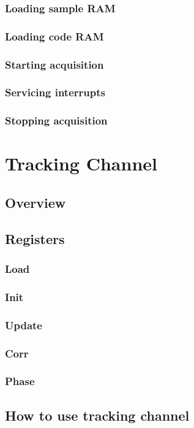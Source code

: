 \documentclass{article}
\begin{document}
\begin{multicols}{2}
\subsubsection{Loading sample RAM}
\subsubsection{Loading code RAM}
\subsubsection{Starting acquisition}
\subsubsection{Servicing interrupts}
\subsubsection{Stopping acquisition}

\section{Tracking Channel}
\subsection{Overview}
\subsection{Registers}
\subsubsection{Load}
\subsubsection{Init}
\subsubsection{Update}
\subsubsection{Corr}
\subsubsection{Phase}
\subsection{How to use tracking channel}

\end{multicols}
\end{document}
